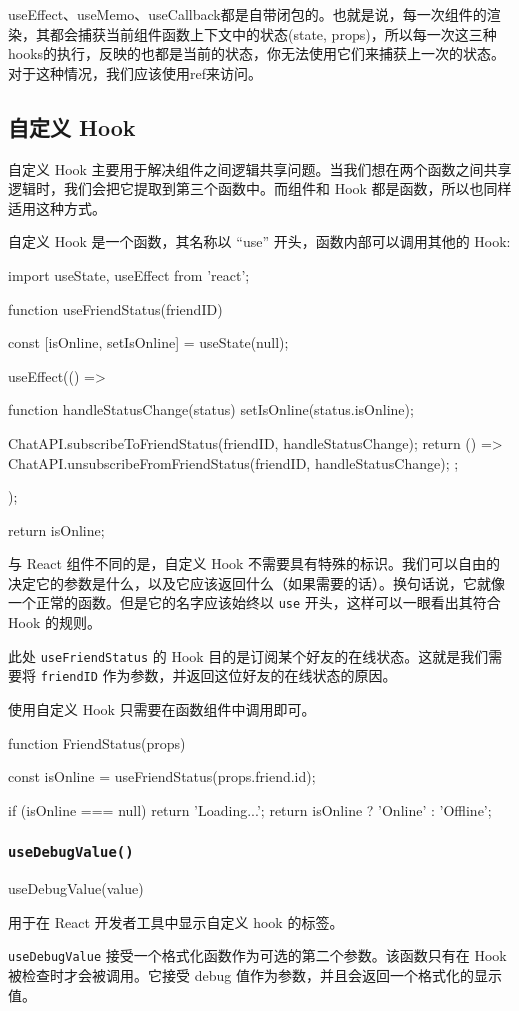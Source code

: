 useEffect、useMemo、useCallback都是自带闭包的。也就是说，每一次组件的渲染，其都会捕获当前组件函数上下文中的状态(state, props)，所以每一次这三种hooks的执行，反映的也都是当前的状态，你无法使用它们来捕获上一次的状态。对于这种情况，我们应该使用ref来访问。


\subsection{自定义 Hook}

自定义 Hook 主要用于解决组件之间逻辑共享问题。当我们想在两个函数之间共享逻辑时，我们会把它提取到第三个函数中。而组件和 Hook 都是函数，所以也同样适用这种方式。

自定义 Hook 是一个函数，其名称以 “use” 开头，函数内部可以调用其他的 Hook:

\begin{JavaScript}
import { useState, useEffect } from 'react';

function useFriendStatus(friendID) {
  const [isOnline, setIsOnline] = useState(null);

  useEffect(() => {
    function handleStatusChange(status) {
      setIsOnline(status.isOnline);
    }

    ChatAPI.subscribeToFriendStatus(friendID, handleStatusChange);
    return () => {
      ChatAPI.unsubscribeFromFriendStatus(friendID, handleStatusChange);
    };
  });

  return isOnline;
}
\end{JavaScript}

与 React 组件不同的是，自定义 Hook 不需要具有特殊的标识。我们可以自由的决定它的参数是什么，以及它应该返回什么（如果需要的话）。换句话说，它就像一个正常的函数。但是它的名字应该始终以 \texttt{use} 开头，这样可以一眼看出其符合 Hook 的规则。

此处 \texttt{useFriendStatus} 的 Hook 目的是订阅某个好友的在线状态。这就是我们需要将 \texttt{friendID} 作为参数，并返回这位好友的在线状态的原因。

使用自定义 Hook 只需要在函数组件中调用即可。

\begin{JavaScript}
function FriendStatus(props) {
  const isOnline = useFriendStatus(props.friend.id);

  if (isOnline === null) {
    return 'Loading...';
  }
  return isOnline ? 'Online' : 'Offline';
}
\end{JavaScript}

\subsubsection{\texttt{useDebugValue()}}

\begin{JavaScript}
useDebugValue(value)
\end{JavaScript}

用于在 React 开发者工具中显示自定义 hook 的标签。

\texttt{useDebugValue} 接受一个格式化函数作为可选的第二个参数。该函数只有在 Hook 被检查时才会被调用。它接受 debug 值作为参数，并且会返回一个格式化的显示值。

\newpage